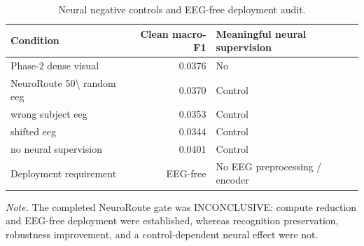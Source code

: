 \begin{table}[t]
\centering
\caption{Neural negative controls and EEG-free deployment audit.}
\label{tab:controls}
\begin{tabular}{lrl}
\toprule
Condition & Clean macro-F1 & Meaningful neural supervision \\
\midrule
Phase-2 dense visual & 0.0376 & No \\
NeuroRoute 50\textbackslash{}%
random eeg & 0.0370 & Control \\
wrong subject eeg & 0.0353 & Control \\
shifted eeg & 0.0344 & Control \\
no neural supervision & 0.0401 & Control \\
Deployment requirement & EEG-free & No EEG preprocessing / encoder \\
\bottomrule
\end{tabular}
\par\smallskip\noindent\footnotesize\textit{Note.} The completed NeuroRoute gate was INCONCLUSIVE: compute reduction and EEG-free deployment were established, whereas recognition preservation, robustness improvement, and a control-dependent neural effect were not.
\end{table}
